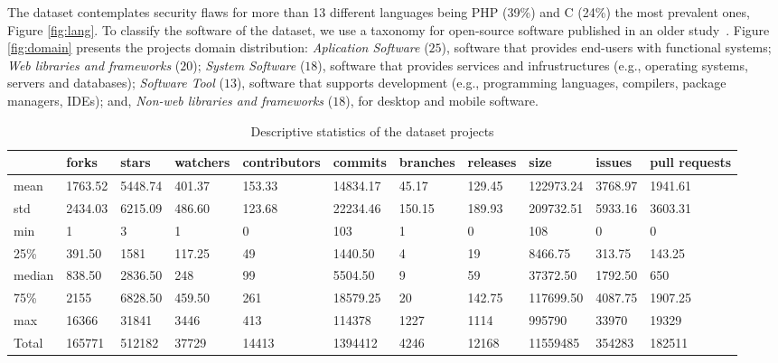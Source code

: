 \documentclass[10pt,conference]{IEEEtran}
\begin{document}
The dataset contemplates security flaws for more than 13 different languages being PHP (39\%) and C (24\%) the most prevalent ones, Figure \ref{fig:lang}.  To classify the software of the dataset, we use a taxonomy for open-source software published in an older study~\cite{7816479}. Figure \ref{fig:domain} presents the projects domain distribution: \textit{Aplication Software} ($25$), software that provides end-users with functional systems; \textit{Web libraries and frameworks} ($20$); \textit{System Software} ($18$), software that provides services and infrustructures (e.g., operating systems, servers and databases); \textit{Software Tool} ($13$), software that supports development (e.g., programming languages, compilers, package managers, IDEs); and, \textit{Non-web libraries and frameworks} ($18$), for desktop and mobile software.

\begin{table}[h]
	\centering
	\caption{Descriptive statistics of the dataset projects}
\begin{tabular}{@{}lllllllllll@{}}
\toprule
      & forks   & stars   & watchers & contributors & commits  & branches & releases & size      & issues & pull requests  \\ \midrule
mean  & 1763.52 & 5448.74 & 401.37   & 153.33       & 14834.17 & 45.17    & 129.45   & 122973.24 & 3768.97   & 1941.61 \\
std   & 2434.03 & 6215.09 & 486.60   & 123.68       & 22234.46 & 150.15   & 189.93   & 209732.51 & 5933.16   & 3603.31 \\
min   & 1       & 3       & 1        & 0            & 103      & 1        & 0        & 108       & 0         & 0       \\
25\%  & 391.50  & 1581    & 117.25   & 49           & 1440.50  & 4        & 19       & 8466.75   & 313.75    & 143.25  \\
median  & 838.50  & 2836.50 & 248      & 99           & 5504.50  & 9        & 59       & 37372.50  & 1792.50   & 650     \\
75\%  & 2155    & 6828.50 & 459.50   & 261          & 18579.25 & 20       & 142.75   & 117699.50 & 4087.75   & 1907.25 \\
max   & 16366   & 31841   & 3446     & 413          & 114378   & 1227     & 1114     & 995790    & 33970     & 19329   \\
Total & 165771  & 512182  & 37729    & 14413        & 1394412  & 4246     & 12168    & 11559485  & 354283    & 182511  \\ \bottomrule
\end{tabular}
\label{tab:dataset}
\end{table}
\end{document}
